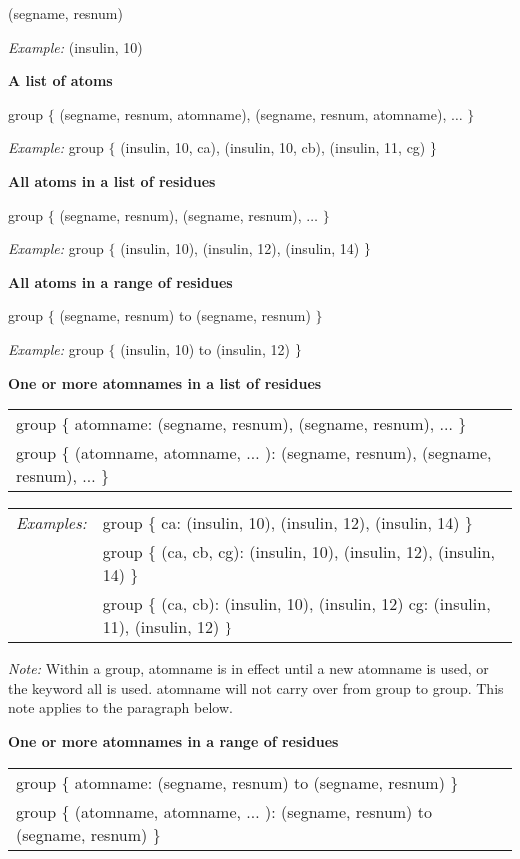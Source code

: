 (segname, resnum)

{\em Example:} (insulin, 10)\medskip 

{\bf A list of atoms}

group $\{$ (segname, resnum, atomname), (segname, resnum, atomname), $\ldots 
$ $\}$

{\em Example:} group $\{$ (insulin, 10, ca), (insulin, 10, cb), (insulin,
11, cg) $\}\medskip $

{\bf All atoms in a list of residues}

group $\{$ (segname, resnum), (segname, resnum), $\ldots $ $\}$

{\em Example:} group $\{$ (insulin, 10), (insulin, 12), (insulin, 14) $%
\}\medskip $

{\bf All atoms in a range of residues}

group $\{$ (segname, resnum) to (segname, resnum) $\}$

{\em Example:} group $\{$ (insulin, 10) to (insulin, 12) $\}\medskip $

{\bf One or more atomnames in a list of residues}

\begin{tabular}{l}
group $\{$ atomname: (segname, resnum), (segname, resnum), $\ldots $ $\}$ \\ 
group $\{$ (atomname, atomname, $\ldots $ ): (segname, resnum), (segname,
resnum), $\ldots $ $\}$%
\end{tabular}

\begin{tabular}{ll}
{\em Examples:} & group $\{$ ca: (insulin, 10), (insulin, 12), (insulin, 14) 
$\}$ \\ 
& group $\{$ (ca, cb, cg): (insulin, 10), (insulin, 12), (insulin, 14) $\}$
\\ 
& group $\{$ (ca, cb): (insulin, 10), (insulin, 12) cg: (insulin, 11),
(insulin, 12) $\}\smallskip $%
\end{tabular}
\medskip 

{\em Note: }Within a group, atomname is in effect until a new atomname is
used, or the keyword all is used. atomname will not carry over from group to
group. This note applies to the paragraph below.\medskip 

{\bf One or more atomnames in a range of residues}

\begin{tabular}{l}
group $\{$ atomname: (segname, resnum) to (segname, resnum) $\}$ \\ 
group $\{$ (atomname, atomname, $\ldots $ ): (segname, resnum) to (segname,
resnum) $\}$%
\end{tabular}

